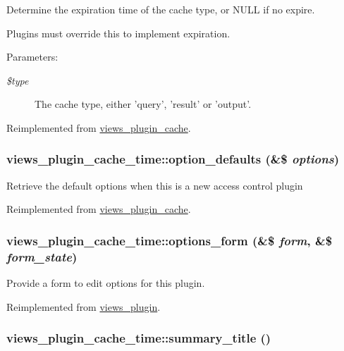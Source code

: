 Determine the expiration time of the cache type, or NULL if no expire.

Plugins must override this to implement expiration.

\begin{Desc}
\item[Parameters:]
\begin{description}
\item[{\em \$type}]The cache type, either 'query', 'result' or 'output'. \end{description}
\end{Desc}


Reimplemented from \hyperlink{classviews__plugin__cache_babefa702965b1e9123a9cdc620f7d52}{views\_\-plugin\_\-cache}.\hypertarget{classviews__plugin__cache__time_c89ed6d01b1bd3b9853166b2048ece8e}{
\subsubsection[{option\_\-defaults}]{\setlength{\rightskip}{0pt plus 5cm}views\_\-plugin\_\-cache\_\-time::option\_\-defaults (\&\$ {\em options})}}
\label{classviews__plugin__cache__time_c89ed6d01b1bd3b9853166b2048ece8e}


Retrieve the default options when this is a new access control plugin 

Reimplemented from \hyperlink{classviews__plugin__cache_80e03aac3729dd6c35dbcf817466469e}{views\_\-plugin\_\-cache}.\hypertarget{classviews__plugin__cache__time_c12d2ba054e232ae1d425d189a2d78d9}{
\subsubsection[{options\_\-form}]{\setlength{\rightskip}{0pt plus 5cm}views\_\-plugin\_\-cache\_\-time::options\_\-form (\&\$ {\em form}, \/  \&\$ {\em form\_\-state})}}
\label{classviews__plugin__cache__time_c12d2ba054e232ae1d425d189a2d78d9}


Provide a form to edit options for this plugin. 

Reimplemented from \hyperlink{classviews__plugin_1aaed8da1afd9f45293a37358c159837}{views\_\-plugin}.\hypertarget{classviews__plugin__cache__time_c8eaac0cd0c620c7583dbbe0481ca62c}{
\subsubsection[{summary\_\-title}]{\setlength{\rightskip}{0pt plus 5cm}views\_\-plugin\_\-cache\_\-time::summary\_\-title ()}}
\label{classviews__plugin__cache__time_c8eaac0cd0c620c7583dbbe0481ca62c}


